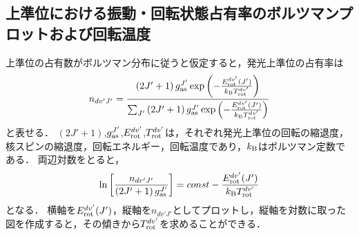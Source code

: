 \subsection{上準位における振動・回転状態占有率のボルツマンプロットおよび回転温度}
上準位の占有数がボルツマン分布に従うと仮定すると，発光上準位の占有率は
\begin{equation}
    n_{dv'J'} = \frac{ \left(  2J'+1 \right) g^{J'}_{\rm as} \exp \left(-\frac{E^{dv'}_{\rm rot}(J')}{k_{\rm B} T^{dv'}_{\rm rot}} \right) }{ \sum_{J'} \left(  2J'+1 \right) g^{J'}_{\rm as} \exp \left(-\frac{E^{dv'}_{\rm rot}(J')}{k_{\rm B} T^{dv'}_{\rm rot}} \right)}
\end{equation}
と表せる．
$(2J'+1)$,$g^{J'}_{\rm as}$,$E^{dv'}_{\rm rot}$,$T^{dv'}_{\rm rot}$は，それぞれ発光上準位の回転の縮退度，核スピンの縮退度，回転エネルギー，回転温度であり，$k_{\rm B}$はボルツマン定数である．
両辺対数をとると，
\begin{equation}
    \ln \left[ \frac{n_{dv'J'}}{\left( 2J'+1 \right) g^{J'}_{\rm as}} \right]
    = const - \frac{E^{dv'}_{\rm rot}(J')}{k_{\rm B} T^{dv'}_{\rm rot}}
\end{equation}
となる．
横軸を$E^{dv'}_{\rm rot}(J')$，縦軸を$n_{dv'J'}$としてプロットし，縦軸を対数に取った図を作成すると，その傾きから$T^{dv'}_{\rm rot}$を求めることができる．

